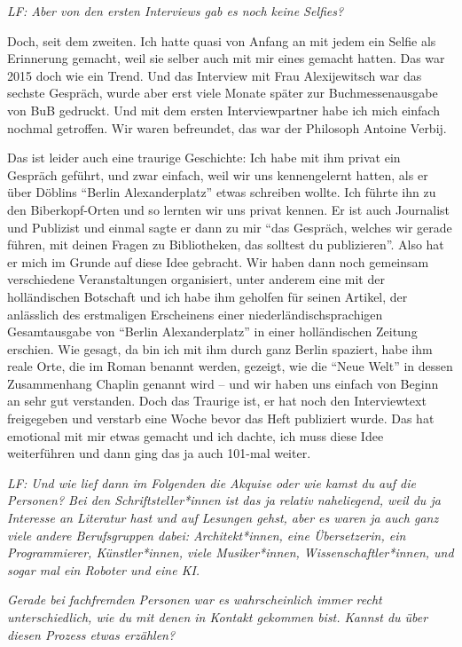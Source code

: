 \documentclass[a4paper,
fontsize=11pt,
oneside,
numbers=noperiodatend,
parskip=half-,
bibliography=totoc,
final
]{scrartcl}
\begin{document}
\emph{LF: Aber von den ersten Interviews gab es noch keine Selfies?}

Doch, seit dem zweiten. Ich hatte quasi von Anfang an mit jedem ein
Selfie als Erinnerung gemacht, weil sie selber auch mit mir eines
gemacht hatten. Das war 2015 doch wie ein Trend. Und das Interview mit
Frau Alexijewitsch war das sechste Gespräch, wurde aber erst viele
Monate später zur Buchmessenausgabe von BuB gedruckt. Und mit dem ersten
Interviewpartner habe ich mich einfach nochmal getroffen. Wir waren
befreundet, das war der Philosoph Antoine Verbij.

Das ist leider auch eine traurige Geschichte: Ich habe mit ihm privat
ein Gespräch geführt, und zwar einfach, weil wir uns kennengelernt
hatten, als er über Döblins \enquote{Berlin Alexanderplatz} etwas
schreiben wollte. Ich führte ihn zu den Biberkopf-Orten und so lernten
wir uns privat kennen. Er ist auch Journalist und Publizist und einmal
sagte er dann zu mir \enquote{das Gespräch, welches wir gerade führen,
mit deinen Fragen zu Bibliotheken, das solltest du publizieren}. Also
hat er mich im Grunde auf diese Idee gebracht. Wir haben dann noch
gemeinsam verschiedene Veranstaltungen organisiert, unter anderem eine
mit der holländischen Botschaft und ich habe ihm geholfen für seinen
Artikel, der anlässlich des erstmaligen Erscheinens einer
niederländischsprachigen Gesamtausgabe von \enquote{Berlin
Alexanderplatz} in einer holländischen Zeitung erschien. Wie gesagt, da
bin ich mit ihm durch ganz Berlin spaziert, habe ihm reale Orte, die im
Roman benannt werden, gezeigt, wie die \enquote{Neue Welt} in dessen
Zusammenhang Chaplin genannt wird -- und wir haben uns einfach von
Beginn an sehr gut verstanden. Doch das Traurige ist, er hat noch den
Interviewtext freigegeben und verstarb eine Woche bevor das Heft
publiziert wurde. Das hat emotional mit mir etwas gemacht und ich
dachte, ich muss diese Idee weiterführen und dann ging das ja auch
101-mal weiter.

\emph{LF: Und wie lief dann im Folgenden die Akquise oder wie kamst du
auf die Personen? Bei den Schriftsteller*innen ist das ja relativ
naheliegend, weil du ja Interesse an Literatur hast und auf Lesungen
gehst, aber es waren ja auch ganz viele andere Berufsgruppen dabei:
Architekt*innen, eine Übersetzerin, ein Programmierer, Künstler*innen,
viele Musiker*innen, Wissenschaftler*innen, und sogar mal ein Roboter
und eine KI.}

\emph{Gerade bei fachfremden Personen war es wahrscheinlich immer recht
unterschiedlich, wie du mit denen in Kontakt gekommen bist. Kannst du
über diesen Prozess etwas erzählen?}
\end{document}

